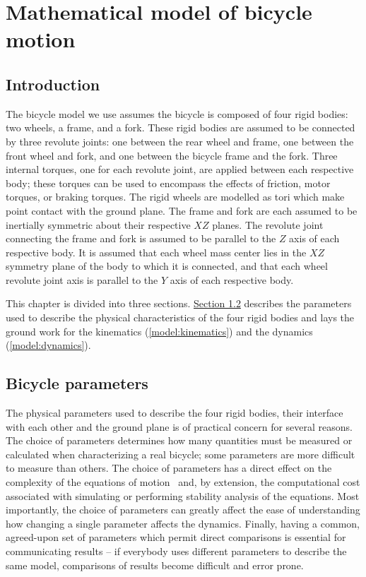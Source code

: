 \chapter{Mathematical model of bicycle motion} \label{chapter2}

\section{Introduction}
The bicycle model we use assumes the bicycle is composed of four rigid bodies:
two wheels, a frame, and a fork. These rigid bodies are assumed to be connected
by three revolute joints: one between the rear wheel and frame, one between the
front wheel and fork, and one between the bicycle frame and the fork. Three
internal torques, one for each revolute joint, are applied between each
respective body; these torques can be used to encompass the effects of
friction, motor torques, or braking torques. The rigid wheels are modelled as
tori which make point contact with the ground plane. The frame and fork are
each assumed to be inertially symmetric about their respective $XZ$ planes. The
revolute joint connecting the frame and fork is assumed to be parallel to the
$Z$ axis of each respective body. It is assumed that each wheel mass center
lies in the $XZ$ symmetry plane of the body to which it is connected, and that
each wheel revolute joint axis is parallel to the $Y$ axis of each respective
body.

This chapter is divided into three sections.
\hyperref[model:bicycle_parameters]{Section \ref{model:bicycle_parameters}}
describes the parameters used to describe the physical characteristics of the
four rigid bodies and lays the ground work for the kinematics
(\autoref{model:kinematics}) and the dynamics (\autoref{model:dynamics}).

\section{Bicycle parameters} \label{model:bicycle_parameters}
The physical parameters used to describe the four rigid bodies, their interface
with each other and the ground plane is of practical concern for several
reasons. The choice of parameters determines how many quantities must be
measured or calculated when characterizing a real bicycle; some parameters are
more difficult to measure than others. The choice of parameters has a direct
effect on the complexity of the equations of
motion~\cite{Wittenburg2008,Mitiguy2001} and, by extension, the computational
cost associated with simulating or performing stability analysis of the
equations. Most importantly, the choice of parameters can greatly affect the
ease of understanding how changing a single parameter affects the dynamics.
Finally, having a common, agreed-upon set of parameters which permit direct
comparisons is essential for communicating results -- if everybody uses
different parameters to describe the same model, comparisons of results become
difficult and error prone.


